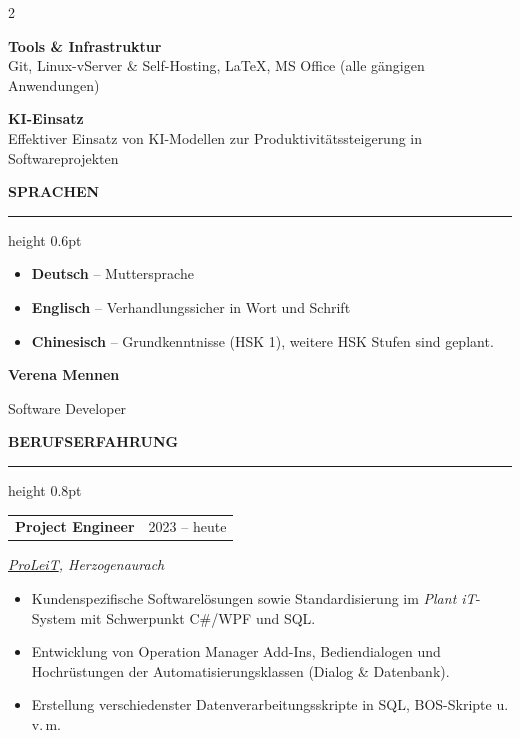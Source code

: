 \documentclass[10pt,a4paper]{article}
\makeatletter
\newcommand{\sideheading}[1]{%
  \vspace{11pt}%
  {\large\bfseries\color{accent}\MakeUppercase{#1}}\par
  \vspace{2pt}%
  {\color{rulecolor}\hrule height 0.6pt}%
  \vspace{6pt}%
}
\newcommand{\mainheading}[1]{%
  \vspace{12pt}%
  {\large\bfseries\color{accent}\MakeUppercase{#1}}\par
  \vspace{2pt}%
  {\color{accent}\hrule height 0.8pt}%
  \vspace{8pt}%
}
\newcommand{\cventry}[2]{%
  \begin{tabularx}{\linewidth}{@{}X@{\hspace{10pt}}r@{}}
    \textbf{#1} & {\small\color{textmuted}#2} \\
  \end{tabularx}\par\vspace{1pt}%
}
\makeatother
\begin{document}
\begin{paracol}{2}
\begin{leftcolumn}
\begin{minipage}[t]{\dimexpr\columnwidth-20pt\relax}
\vspace{6pt}
\textbf{Tools \& Infrastruktur}\\
Git, Linux-vServer \& Self-Hosting, LaTeX, MS Office (alle gängigen Anwendungen)


\vspace{6pt}
\textbf{KI-Einsatz}\\
Effektiver Einsatz von KI-Modellen zur Produktivitätssteigerung in Softwareprojekten

\sideheading{Sprachen}
\begin{itemize}[leftmargin=10pt, topsep=2pt, itemsep=3pt]
  \item \textbf{Deutsch} -- Muttersprache
  \item \textbf{Englisch} -- Verhandlungssicher in Wort und Schrift
  \item \textbf{Chinesisch} -- Grundkenntnisse (HSK 1), weitere HSK Stufen sind geplant.
\end{itemize}

\end{minipage}
\end{leftcolumn}

\begin{rightcolumn}
\vspace*{4pt}

{\Huge\bfseries\color{accent} Verena Mennen}\par
\vspace{3pt}
{\Large\color{textmuted} Software Developer}\par
\vspace{6pt}

\mainheading{Berufserfahrung}

\cventry{Project Engineer}{2023 -- heute}
{\small\textit{\href{https://www.proleit.de/}{ProLeiT}, Herzogenaurach}}
\begin{itemize}
  \item Kundenspezifische Softwarelösungen sowie Standardisierung im \textit{Plant iT}-System mit Schwerpunkt C\#/WPF und SQL.
  \item Entwicklung von Operation Manager Add-Ins, Bediendialogen und Hochrüstungen der Automatisierungsklassen (Dialog \& Datenbank).
  \item Erstellung verschiedenster Datenverarbeitungsskripte in SQL, BOS-Skripte u.\,v.\,m.
\end{itemize}
\vspace{9pt}


\end{rightcolumn}
\end{paracol}
\end{document}
